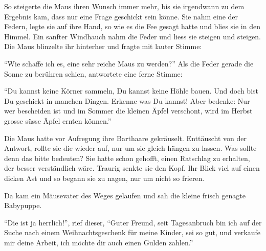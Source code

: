 So steigerte die Maus ihren Wunsch immer mehr, bis sie irgendwann zu dem Ergebnis kam, dass nur eine Frage geschickt sein könne. Sie nahm eine der Federn, legte sie auf ihre Hand, so wie es die Fee gesagt hatte und blies sie in den Himmel. Ein sanfter Windhauch nahm die Feder und liess sie steigen und steigen. Die Maus blinzelte ihr hinterher und fragte mit lauter Stimme: 

\enquote{Wie schaffe ich es, eine sehr reiche Maus zu werden?} Als die Feder gerade die Sonne zu berühren schien, antwortete eine ferne Stimme:

\enquote{Du kannst keine Körner sammeln, Du kannst keine Höhle bauen. Und doch bist Du geschickt in manchen Dingen. Erkenne was Du kannst! Aber bedenke: Nur wer bescheiden ist und im Sommer die kleinen Äpfel verschont, wird im Herbst grosse süsse Äpfel ernten können.} 

Die Maus hatte vor Aufregung ihre Barthaare gekräuselt. Enttäuscht von der Antwort, rollte sie die wieder auf, nur um sie gleich hängen zu lassen. Was sollte denn das bitte bedeuten? Sie hatte schon gehofft, einen Ratschlag zu erhalten, der besser verständlich wäre. Traurig senkte sie den Kopf. Ihr Blick viel auf einen dicken Ast und so begann sie zu nagen, nur um nicht so frieren. 

Da kam ein Mäusevater des Weges gelaufen und sah die kleine frisch genagte Babypuppe. 

\enquote{Die ist ja herrlich!}, rief dieser, \enquote{Guter Freund, seit Tagesanbruch bin ich auf der Suche nach einem Weihnachtsgeschenk für meine Kinder, sei so gut, und verkaufe mir deine Arbeit, ich möchte dir auch einen Gulden zahlen.}


